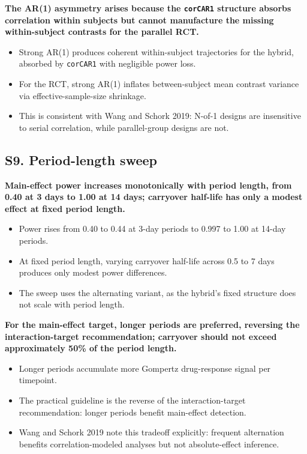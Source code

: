 \documentclass[
  11pt,
]{article}
\begin{document}
\textbf{The AR(1) asymmetry arises because the \texttt{corCAR1} structure absorbs correlation within subjects but cannot manufacture the missing within-subject contrasts for the parallel RCT.}

\begin{itemize}\setlength{\itemsep}{2pt}\setlength{\parskip}{0pt}
\item Strong AR(1) produces coherent within-subject trajectories for the hybrid, absorbed by \texttt{corCAR1} with negligible power loss.
\item For the RCT, strong AR(1) inflates between-subject mean contrast variance via effective-sample-size shrinkage.
\item This is consistent with Wang and Schork 2019: N-of-1 designs are insensitive to serial correlation, while parallel-group designs are not.
\end{itemize}

\subsection{S9. Period-length sweep}\label{s9.-period-length-sweep}

\textbf{Main-effect power increases monotonically with period length, from 0.40 at 3 days to 1.00 at 14 days; carryover half-life has only a modest effect at fixed period length.}

\begin{itemize}\setlength{\itemsep}{2pt}\setlength{\parskip}{0pt}
\item Power rises from 0.40 to 0.44 at 3-day periods to 0.997 to 1.00 at 14-day periods.
\item At fixed period length, varying carryover half-life across 0.5 to 7 days produces only modest power differences.
\item The sweep uses the alternating variant, as the hybrid's fixed structure does not scale with period length.
\end{itemize}

\textbf{For the main-effect target, longer periods are preferred, reversing the interaction-target recommendation; carryover should not exceed approximately 50\% of the period length.}

\begin{itemize}\setlength{\itemsep}{2pt}\setlength{\parskip}{0pt}
\item Longer periods accumulate more Gompertz drug-response signal per timepoint.
\item The practical guideline is the reverse of the interaction-target recommendation: longer periods benefit main-effect detection.
\item Wang and Schork 2019 note this tradeoff explicitly: frequent alternation benefits correlation-modeled analyses but not absolute-effect inference.
\end{itemize}
\end{document}
